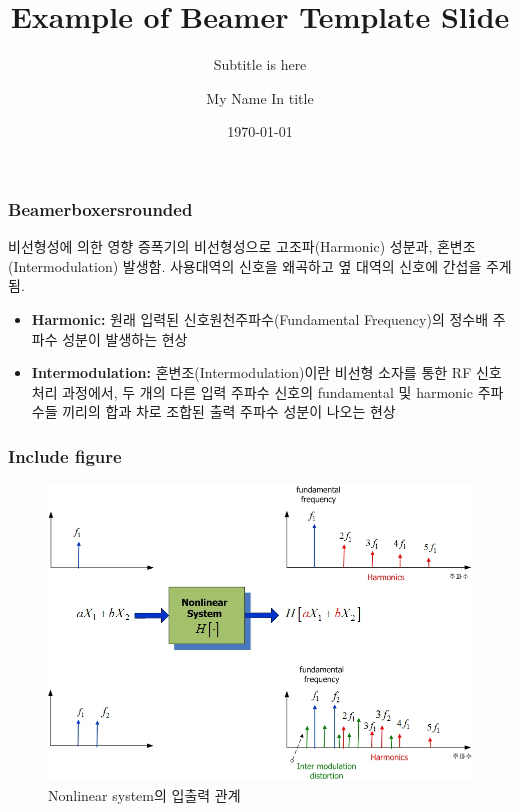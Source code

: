 \documentclass{beamer}
\title{Example of Beamer Template Slide }
\subtitle{Subtitle is here}
\author[my name in footer]{My Name In title}
\institute[OrganizationI/Section]
{
  Your Institute \\
  department \\
  section}
\date{\today}
\begin{document}
\frame{\titlepage}


\begin{frame}
\frametitle{Beamerboxersrounded}

  \begin{beamerboxesrounded}[upper=uppercol,lower=lowercol,shadow=true]
  {비선형성에 의한 영향}
  증폭기의 비선형성으로 고조파(Harmonic) 성분과, 혼변조(Intermodulation) 발생함.   사용대역의 신호을 왜곡하고 옆 대역의 신호에 간섭을 주게 됨.
  \begin{itemize}
    \item {\bf Harmonic: } 원래 입력된 신호원천주파수(Fundamental Frequency)의 정수배 주파수 성분이 발생하는 현상
    \item {\bf Intermodulation: } 혼변조(Intermodulation)이란 비선형 소자를 통한 RF 신호처리 과정에서, 두 개의 다른 입력 주파수 신호의
  fundamental 및 harmonic 주파수들 끼리의 합과 차로 조합된 출력 주파수 성분이 나오는 현상

  \end{itemize}
 \end{beamerboxesrounded}
\end{frame}



\begin{frame}
\frametitle{Include figure}

\begin{figure}[h]
\begin{center}
   \includegraphics[scale=0.3]{Figures/Nonlinear.jpg}
   \caption{Nonlinear system의 입출력 관계}
  \label{fig:nonlinear}
\end{center}
\end{figure}
\end{frame}
\end{document}
